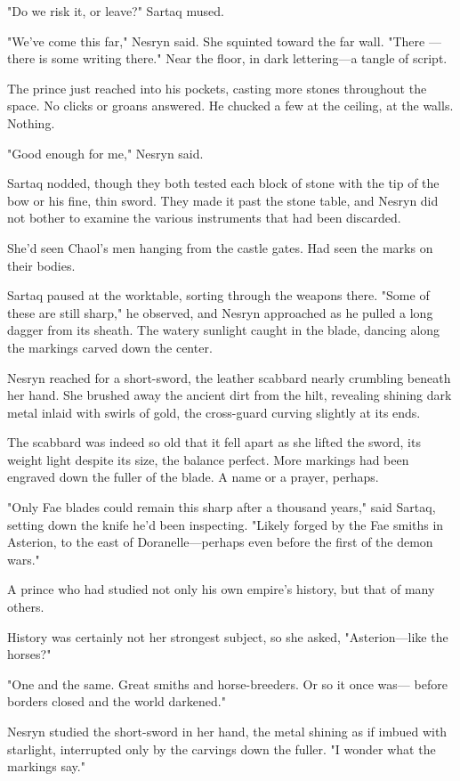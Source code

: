 "Do we risk it, or leave?" Sartaq mused.

"We've come this far," Nesryn said. She squinted toward the far wall. "There ---there is some writing there." Near the floor, in dark lettering---a tangle of script.

The prince just reached into his pockets, casting more stones throughout the space. No clicks or groans answered. He chucked a few at the ceiling, at the walls. Nothing.

"Good enough for me," Nesryn said.

Sartaq nodded, though they both tested each block of stone with the tip of the bow or his fine, thin sword. They made it past the stone table, and Nesryn did not bother to examine the various instruments that had been discarded.

She'd seen Chaol's men hanging from the castle gates. Had seen the marks on their bodies.

Sartaq paused at the worktable, sorting through the weapons there. "Some of these are still sharp," he observed, and Nesryn approached as he pulled a long dagger from its sheath. The watery sunlight caught in the blade, dancing along the markings carved down the center.

Nesryn reached for a short-sword, the leather scabbard nearly crumbling beneath her hand. She brushed away the ancient dirt from the hilt, revealing shining dark metal inlaid with swirls of gold, the cross-guard curving slightly at its ends.

The scabbard was indeed so old that it fell apart as she lifted the sword, its weight light despite its size, the balance perfect. More markings had been engraved down the fuller of the blade. A name or a prayer, perhaps.

"Only Fae blades could remain this sharp after a thousand years," said Sartaq, setting down the knife he'd been inspecting. "Likely forged by the Fae smiths in Asterion, to the east of Doranelle---perhaps even before the first of the demon wars."

A prince who had studied not only his own empire's history, but that of many others.

History was certainly not her strongest subject, so she asked, "Asterion---like the horses?"

"One and the same. Great smiths and horse-breeders. Or so it once was--- before borders closed and the world darkened."

Nesryn studied the short-sword in her hand, the metal shining as if imbued with starlight, interrupted only by the carvings down the fuller. "I wonder what the markings say."

